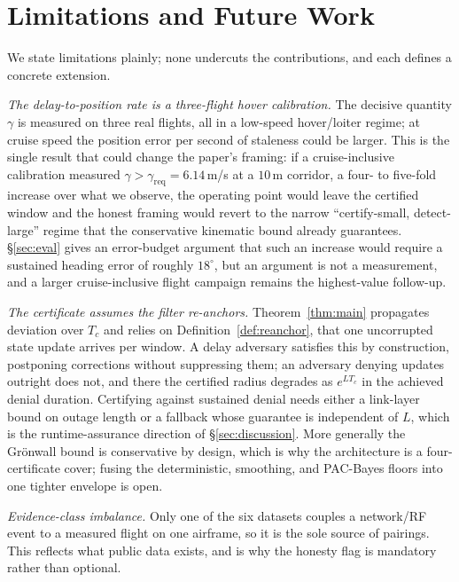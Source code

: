 \section{Limitations and Future Work}
\label{sec:limitations}
We state limitations plainly; none undercuts the contributions, and each defines
a concrete extension.

\emph{The delay-to-position rate is a three-flight hover calibration.} The
decisive quantity $\gamma$ is measured on three real flights, all in a low-speed
hover/loiter regime; at cruise speed the position error per second of staleness
could be larger. This is the single result that could change the paper's
framing: if a cruise-inclusive calibration measured
$\gamma>\gamma_{\mathrm{req}}=6.14$\,m/s at a $10$\,m corridor, a
four- to five-fold increase over what we observe, the operating point would
leave the certified window and the honest framing would revert to the narrow
``certify-small, detect-large'' regime that the conservative kinematic bound
already guarantees. \S\ref{sec:eval} gives an error-budget argument that such an
increase would require a sustained heading error of roughly $18^\circ$, but an
argument is not a measurement, and a larger cruise-inclusive flight campaign
remains the highest-value follow-up.

\emph{The certificate assumes the filter re-anchors.} Theorem~\ref{thm:main}
propagates deviation over $T_c$ and relies on Definition~\ref{def:reanchor},
that one uncorrupted state update arrives per window. A delay adversary
satisfies this by construction, postponing corrections without suppressing them;
an adversary denying updates outright does not, and there the certified radius
degrades as $e^{LT_c}$ in the achieved denial duration. Certifying against
sustained denial needs either a link-layer bound on outage length or a fallback
whose guarantee is independent of $L$, which is the runtime-assurance direction
of \S\ref{sec:discussion}. More generally the Gr\"onwall bound is conservative
by design, which is why the architecture is a four-certificate cover; fusing the
deterministic, smoothing, and PAC-Bayes floors into one tighter envelope is
open.

\emph{Evidence-class imbalance.} Only one of the six datasets couples a
network/RF event to a measured flight on one airframe, so it is the sole source
of  pairings. This reflects what public data
exists, and is why the honesty flag is mandatory rather than optional.


